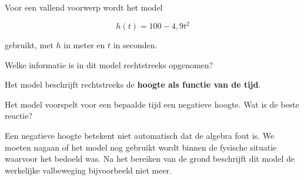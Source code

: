 \documentclass{ximera}
\begin{document}

\begin{oefening}{\oefU \ESS}

Voor een vallend voorwerp wordt het model

\[
h(t)=100-4{,}9t^2
\]

gebruikt, met $h$ in meter en $t$ in seconden.

\begin{question}
Welke informatie is in dit model rechtstreeks opgenomen?

\begin{multipleChoice}
\end{multipleChoice}


\begin{oplossing}
Het model beschrijft rechtstreeks de \textbf{hoogte als functie van de tijd}.
\end{oplossing}

\end{question}

\begin{question}
Het model voorspelt voor een bepaalde tijd een negatieve hoogte.
Wat is de beste reactie?

\begin{multipleChoice}
\end{multipleChoice}


\begin{oplossing}
Een negatieve hoogte betekent niet automatisch dat de algebra fout is.
We moeten nagaan of het model nog gebruikt wordt binnen de fysische
situatie waarvoor het bedoeld was. Na het bereiken van de grond
beschrijft dit model de werkelijke valbeweging bijvoorbeeld niet meer.
\end{oplossing}

\end{question}

\end{oefening}
\end{document}
